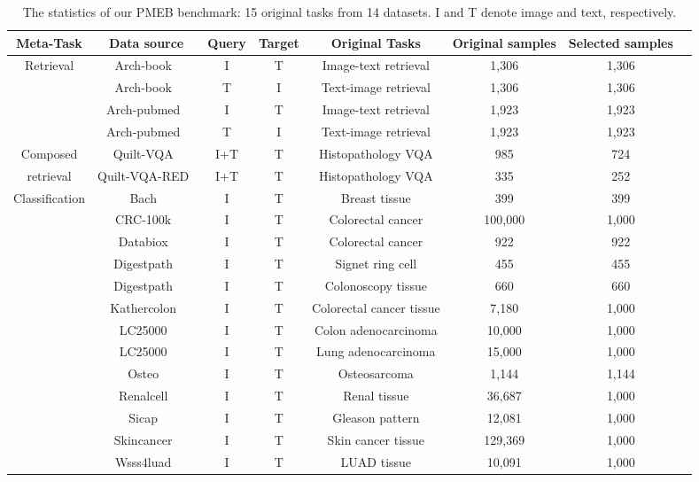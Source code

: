 \begin{table*}[h!]
\small
\centering
\begin{tabular}{cccccccc}
\hline
Meta-Task&Data source&Query&Target&Original Tasks&Original samples&Selected samples\\
\hline
\multirow{4}{*}{Retrieval}&Arch-book~\cite{gamper2021multiple}& I & T & Image-text retrieval &1,306&1,306 \\ 
&Arch-book~\cite{gamper2021multiple}& T & I & Text-image retrieval&1,306&1,306 \\ 
&Arch-pubmed~\cite{gamper2021multiple}& I & T & Image-text retrieval&1,923&1,923 \\ 
&Arch-pubmed~\cite{gamper2021multiple}& T & I & Text-image retrieval&1,923&1,923 \\ 
\hline
Composed& Quilt-VQA~\cite{seyfioglu2024quilt} & I+T & T & Histopathology VQA&985&724\\ 
retrieval& Quilt-VQA-RED~\cite{seyfioglu2024quilt} & I+T & T & Histopathology VQA&335&252\\ 
\hline
\multirow{12}{*}{Classification}& Bach~\cite{aresta2019bach}& I & T & Breast tissue&399&399\\ 
& CRC-100k~\cite{kather2018100} & I & T & Colorectal cancer&100,000&1,000\\
& Databiox~\cite{kather2018100} & I & T & Colorectal cancer&922&922\\
& Digestpath~\cite{da2022digestpath} & I & T & Signet ring cell&455&455\\ 
& Digestpath~\cite{da2022digestpath} & I & T & Colonoscopy tissue &660&660\\ 
& Kathercolon~\cite{kather2019predicting} & I & T & Colorectal cancer tissue&7,180&1,000\\
& LC25000~\cite{borkowski2019lung} & I & T & Colon adenocarcinoma&10,000&1,000\\ 
& LC25000~\cite{borkowski2019lung} & I & T & Lung adenocarcinoma&15,000&1,000\\ 
& Osteo~\cite{arunachalam2019viable} & I & T & Osteosarcoma&1,144&1,144\\ 
& Renalcell~\cite{brummer2022integrative} & I & T & Renal tissue&36,687&1,000\\
& Sicap~\cite{silva2020going} & I & T & Gleason pattern &12,081&1,000\\ 
& Skincancer~\cite{kriegsmann2022deep} & I & T & Skin cancer tissue&129,369&1,000\\ 
& Wsss4luad~\cite{han2022wsss4luad} & I & T & LUAD tissue&10,091&1,000\\ 
\hline
\end{tabular}
\caption{The statistics of our PMEB benchmark: 15 original tasks from 14 datasets. I and T denote image and text, respectively.}
\vspace{-2ex}
\label{t1}
\end{table*}
